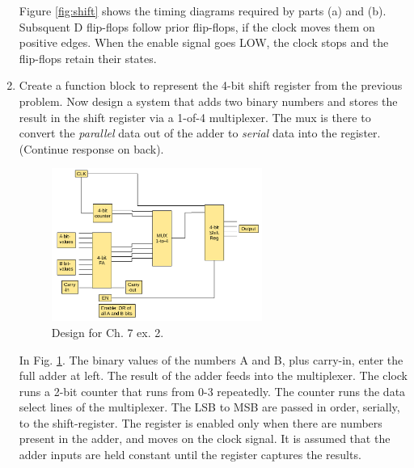 \documentclass[10pt]{article}
\begin{document}
\begin{enumerate}
Figure \ref{fig:shift} shows the timing diagrams required by parts (a) and (b).  Subsquent D flip-flops follow prior flip-flops, if the clock moves them on positive edges. When the enable signal goes LOW, the clock stops and the flip-flops retain their states. \\
\item Create a function block to represent the 4-bit shift register from the previous problem.  Now design a system that adds two binary numbers and stores the result in the shift register via a 1-of-4 multiplexer.  The mux is there to convert the \textit{parallel} data out of the adder to \textit{serial} data into the register. (Continue response on back). \\ 
\begin{figure}
\centering
\includegraphics[width=0.65\textwidth]{figures/design4.pdf}
\caption{\label{fig:addMux} Design for Ch. 7 ex. 2.}
\end{figure}
In Fig. \ref{fig:addMux}.  The binary values of the numbers A and B, plus carry-in, enter the full adder at left.  The result of the adder feeds into the multiplexer.  The clock runs a 2-bit counter that runs from 0-3 repeatedly.  The counter runs the data select lines of the multiplexer.  The LSB to MSB are passed in order, serially, to the shift-register.  The register is enabled only when there are numbers present in the adder, and moves on the clock signal.  It is assumed that the adder inputs are held constant until the register captures the results.
\end{enumerate}
\end{document}
